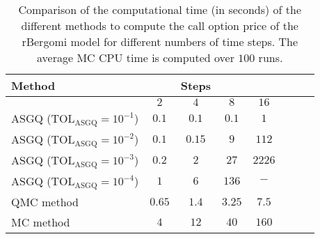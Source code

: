 \FloatBarrier
\begin{table}[h!]
	\centering
	\begin{tabular}{l*{6}{c}r}
		\toprule[1.5pt]
		Method & & Steps  & &     \\
		\hline	
		& $2$ & $4$ & $8$ & $16$ &   \\
		\hline
		ASGQ ($\text{TOL}_{\text{ASGQ}}=10^{-1}$)  & $0.1$ & $0.1$ & $0.1$ & $1$ \\
		ASGQ ($\text{TOL}_{\text{ASGQ}}=10^{-2}$)  & $0.1$ & $0.15$ & $9$ & $112$ \\
		ASGQ ($\text{TOL}_{\text{ASGQ}}=10^{-3}$)  & $0.2$ & $2$ & $27$ & $2226$ \\
		ASGQ ($\text{TOL}_{\text{ASGQ}}=10^{-4}$)  & $1$ & $6$ & $136$ & $-$\\
		\hline
		QMC method    & $0.65$  & $ 1.4$  & $  3.25$ & $ 7.5
		$  \\	
		\hline
		MC method   & $4$  & $ 12$  & $  40$ & $ 160
		$  \\	
		\bottomrule[1.25pt]
	\end{tabular}
	\caption{Comparison of the computational time (in seconds) of the different methods to compute the call option price of the rBergomi model for different numbers of time steps. The average  MC CPU time is computed over $100$ runs. }
	\label{Comparsion of the computational time of  MC and MISC, used to compute Call option price of rBergomi model for different number of time steps. Case set4}
\end{table}


\FloatBarrier

